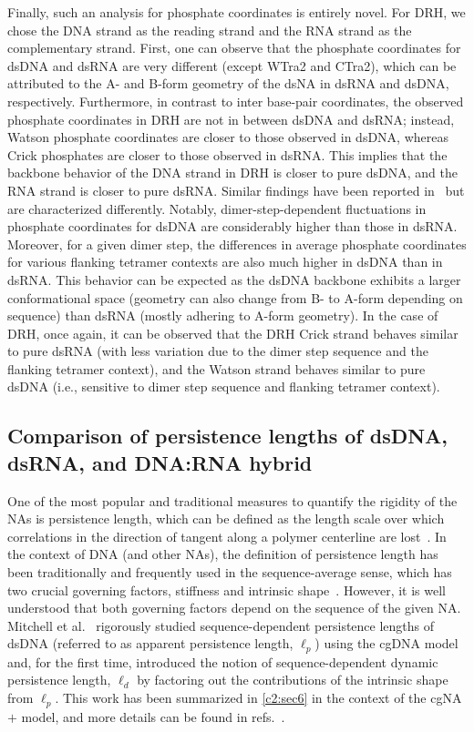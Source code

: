 Finally, such an analysis for phosphate coordinates is entirely novel.
For DRH, we chose the DNA strand as the reading strand and the RNA strand as the complementary strand.
First, one can observe that the phosphate coordinates for dsDNA and dsRNA are very different (except WTra2 and CTra2), which can be attributed to the A- and B-form geometry of the dsNA in dsRNA and dsDNA, respectively.
Furthermore, in contrast to inter base-pair coordinates, the observed phosphate coordinates in DRH are not in between dsDNA and dsRNA; instead, Watson phosphate coordinates are closer to those observed in dsDNA, whereas Crick phosphates are closer to those observed in dsRNA.
This implies that the backbone behavior of the DNA strand in DRH is closer to pure dsDNA, and the RNA strand is closer to pure dsRNA. 
Similar findings have been reported in~\cite{noy2005structure,noy2008theoretical,cheatham1997molecular,liu2019structural} but are characterized differently.
Notably, dimer-step-dependent fluctuations in phosphate coordinates for dsDNA are considerably higher than those in dsRNA.
Moreover, for a given dimer step, the differences in average phosphate coordinates for various flanking tetramer contexts are also much higher in dsDNA than in dsRNA.
This behavior can be expected as the dsDNA backbone exhibits a larger conformational space (geometry can also change from B- to A-form depending on sequence) than dsRNA (mostly adhering to A-form geometry).
In the case of DRH, once again, it can be observed that the DRH Crick strand behaves similar to pure dsRNA (with less variation due to the dimer step sequence and the flanking tetramer context), and the Watson strand behaves similar to pure dsDNA (i.e., sensitive to dimer step sequence and flanking tetramer context). \clearpage

\subsection{Comparison of persistence lengths of dsDNA, dsRNA, and DNA:RNA hybrid}\label{c4:s5sb3}
One of the most popular and traditional measures to quantify the rigidity of the NAs is persistence length, which can be defined as the length scale over which correlations in the direction of tangent along a polymer centerline are lost~\cite{hagerman1988flexibility}. 
In the context of DNA (and other NAs), the definition of persistence length has been traditionally and frequently used in the sequence-average sense, which has two crucial governing factors, stiffness and intrinsic shape~\cite{trifonov1987dna}. 
However, it is well understood that both governing factors depend on the sequence of the given NA.
Mitchell et al.~\cite{cgdnamc} rigorously studied sequence-dependent persistence lengths of dsDNA (referred to as apparent persistence length, $\ell_{p}$) using the cgDNA model and, for the first time, introduced the notion of sequence-dependent dynamic persistence length, $\ell_{d}$ by factoring out the contributions of the intrinsic shape from $\ell_{p}$.
This work has been summarized in \cref{c2:sec6} in the context of the cgNA$+$ model, and more details can be found in refs.~\cite{patelithesis,cgdnamc}.

